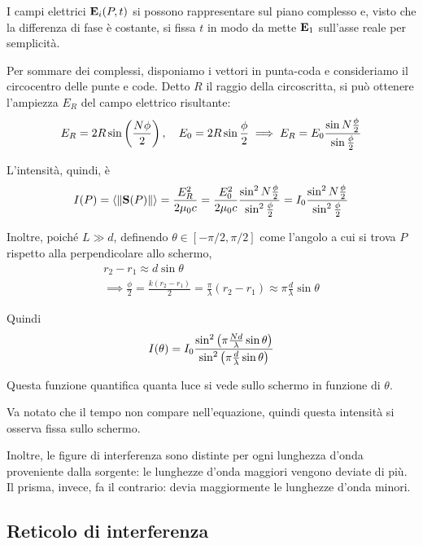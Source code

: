 I campi elettrici $\mathbf{E}_i(P, t)$ si possono rappresentare sul piano complesso e, visto che la differenza di fase è costante, si fissa $t$ in modo da mette $\mathbf{E}_1$ sull'asse reale per semplicità.

Per sommare dei complessi, disponiamo i vettori in punta-coda e consideriamo il circocentro delle punte e code.
Detto $R$ il raggio della circoscritta, si può ottenere l'ampiezza $E_R$ del campo elettrico risultante:
\begin{equation}
    E_R = 2 R \sin\left( \frac{N \phi}{2} \right), \quad E_0 = 2 R \sin\frac{\phi}{2}
    \implies E_R = E_0 \frac{\sin N \frac{\phi}{2}}{\sin \frac{\phi}{2}}
\end{equation}

L'intensità, quindi, è
\begin{equation}
    I(P) = \left\langle \left\lVert \mathbf{S}(P) \right\rVert \right\rangle = \frac{E_R^2}{2 \mu_0 c} = \frac{E_0^2}{2 \mu_0 c} \frac{\sin^2 N\frac{\phi}{2}}{\sin^2 \frac{\phi}{2}} = I_0 \frac{\sin^2 N\frac{\phi}{2}}{\sin^2 \frac{\phi}{2}}
\end{equation}

Inoltre, poiché $L \gg d$, definendo $\theta \in [-\pi / 2, \pi / 2]$ come l'angolo a cui si trova $P$ rispetto alla perpendicolare allo schermo,
\begin{gather}
    r_2 - r_1 \approx d \sin \theta \\
    \implies \frac{\phi}{2} = \frac{k (r_2 - r_1)}{2} = \frac{\pi}{\lambda} (r_2 - r_1) \approx \pi \frac{d}{\lambda} \sin \theta
\end{gather}

Quindi
\begin{equation}
\label{eq:reticolo}
    I(\theta) = I_0 \frac{\sin^2 \left( \pi \frac{N d}{\lambda} \sin \theta \right)}{\sin^2 \left( \pi \frac{d}{\lambda} \sin \theta \right)}
\end{equation}

Questa funzione quantifica quanta luce si vede sullo schermo in funzione di $\theta$.

Va notato che il tempo non compare nell'equazione, quindi questa intensità si osserva fissa sullo schermo.

Inoltre, le figure di interferenza sono distinte per ogni lunghezza d'onda proveniente dalla sorgente: le lunghezze d'onda maggiori vengono deviate di più.
Il prisma, invece, fa il contrario: devia maggiormente le lunghezze d'onda minori.

\subsection{Reticolo di interferenza}

